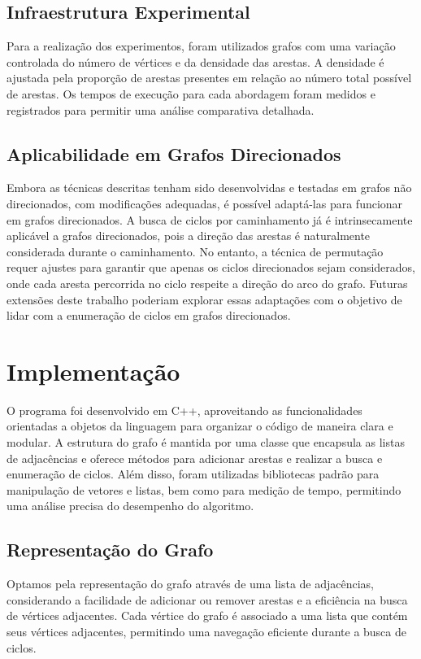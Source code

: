 \documentclass{article}
\begin{document}
\subsection{Infraestrutura Experimental}

Para a realização dos experimentos, foram utilizados grafos com uma variação controlada do número de vértices e da densidade das arestas. A densidade é ajustada pela proporção de arestas presentes em relação ao número total possível de arestas. Os tempos de execução para cada abordagem foram medidos e registrados para permitir uma análise comparativa detalhada.

\subsection{Aplicabilidade em Grafos Direcionados}

Embora as técnicas descritas tenham sido desenvolvidas e testadas em grafos não direcionados, com modificações adequadas, é possível adaptá-las para funcionar em grafos direcionados. A busca de ciclos por caminhamento já é intrinsecamente aplicável a grafos direcionados, pois a direção das arestas é naturalmente considerada durante o caminhamento. No entanto, a técnica de permutação requer ajustes para garantir que apenas os ciclos direcionados sejam considerados, onde cada aresta percorrida no ciclo respeite a direção do arco do grafo. Futuras extensões deste trabalho poderiam explorar essas adaptações com o objetivo de lidar com a enumeração de ciclos em grafos direcionados.


\section{Implementação}
O programa foi desenvolvido em C++, aproveitando as funcionalidades orientadas a objetos da linguagem para organizar o código de maneira clara e modular. A estrutura do grafo é mantida por uma classe que encapsula as listas de adjacências e oferece métodos para adicionar arestas e realizar a busca e enumeração de ciclos. Além disso, foram utilizadas bibliotecas padrão para manipulação de vetores e listas, bem como para medição de tempo, permitindo uma análise precisa do desempenho do algoritmo.


\subsection{Representação do Grafo}

Optamos pela representação do grafo através de uma lista de adjacências, considerando a facilidade de adicionar ou remover arestas e a eficiência na busca de vértices adjacentes. Cada vértice do grafo é associado a uma lista que contém seus vértices adjacentes, permitindo uma navegação eficiente durante a busca de ciclos.
\end{document}
